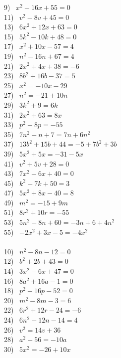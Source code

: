 \begin{multicols}{2}
  9)~ $x^2 - 16 x + 55 = 0$\\
  11)~ $v^2 - 8 v + 45 = 0$\\
  13)~ $6 x^2 + 12 x + 63 = 0$\\
  15)~ $5 k^2 - 10 k + 48 = 0$\\
  17)~ $x^2 + 10 x - 57 = 4$\\
  19)~ $n^2 - 16 n + 67 = 4$\\
  21)~ $2 x^2 + 4 x + 38 = - 6$\\
  23)~ $8 b^2 + 16 b - 37 = 5$\\
  25)~ $x^2 = - 10 x - 29$\\
  27)~ $n^2 = - 21 + 10 n$\\
  29)~ $3 k^2 + 9 = 6 k$\\
  31)~ $2 x^2 + 63 = 8 x$\\
  33)~ $p^2 - 8 p = - 55$\\
  35)~ $7 n^2 - n + 7 = 7 n + 6 n^2$\\
  37)~ $13 b^2 + 15 b + 44 = - 5 + 7 b^2 + 3 b$\\
  39)~ $5 x^2 + 5 x = - 31 - 5 x$\\
  41)~ $v^2 + 5 v + 28 = 0$\\
  43)~ $7 x^2 - 6 x + 40 = 0$\\
  45)~ $k^2 - 7 k + 50 = 3$\\
  47)~ $5 x^2 + 8 x - 40 = 8$\\
  49)~ $m^2 = - 15 + 9 m$\\
  51)~ $8 r^2 + 10 r = - 55$\\
  53)~ $5 n^2 - 8 n + 60 = - 3 n + 6 + 4 n^2$\\
  55)~ $- 2 x^2 + 3 x - 5 = - 4 x^2$\\
~\\
  10)~ $n^2 - 8 n - 12 = 0$\\
  12)~ $b^2 + 2 b + 43 = 0$\\
  14)~ $3 x^2 - 6 x + 47 = 0$\\
  16)~ $8 a^2 + 16 a - 1 = 0$\\
  18)~ $p^2 - 16 p - 52 = 0$\\
  20)~ $m^2 - 8 m - 3 = 6$\\
  22)~ $6 r^2 + 12 r - 24 = - 6$\\
  24)~ $6 n^2 - 12 n - 14 = 4$\\
  26)~ $v^2 = 14 v + 36$\\
  28)~ $a^2 - 56 = - 10 a$\\
  30)~ $5 x^2 = - 26 + 10 x$\\

\end{multicols}
